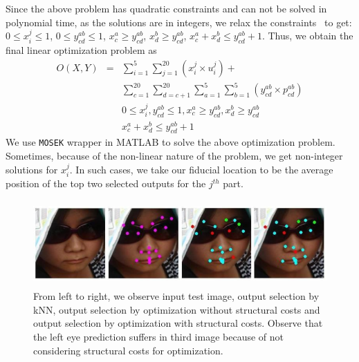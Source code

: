 
Since the above problem has quadratic constraints and can not be solved in polynomial time, as the solutions are in integers, we
relax the constraints~\cite{DBLP:journals/corr/ChariLLS14} to get:
$0 \leq x_i^j \leq 1$, $0 \leq y_{cd}^{ab} \leq 1$, $x_c^a \geq y_{cd}^{ab}$, $x_d^b \geq
y_{cd}^{ab}$, $x_c^a + x_d^b \le y_{cd}^{ab} + 1$. Thus, we obtain the final linear
optimization problem as 
\begin{eqnarray}
O(X,Y) & = & \sum_{i=1}^{5} \sum_{j=1}^{20} (x_i^j \times u_i^j) + \nonumber \\
        & & \sum_{c=1}^{20} \sum_{d=c+1}^{20} \sum_{a=1}^{5} \sum_{b=1}^{5} (y_{cd}^{ab} \times p_{cd}^{ab}) \nonumber \\
        & & 0 \leq x_i^j, y^{ab}_{cd} \leq 1, x_c^a \geq y_{cd}^{ab}, x_d^b \geq y_{cd}^{ab} \nonumber \\
        & & x_c^a + x_d^b \le y_{cd}^{ab} + 1 
\end{eqnarray}
We use {\tt MOSEK} wrapper in MATLAB to solve the above optimization problem. Sometimes, because of
the non-linear nature of the problem, we get non-integer solutions for $x^j_i$. In such cases, we
take our fiducial location to be the average position of the top two selected outputs for the
$j^{th}$ part.

\begin{figure}
\centering
\includegraphics[width=4.5in,height=1.3in]{fid/figures/with_without_pairwise.png}
\caption{From left to right, we observe input test image, output selection by kNN, output selection by optimization without structural costs and output selection by optimization with structural costs. Observe that the left eye prediction suffers in third image because of not considering structural costs for optimization.}
\label{fig:with_without_structural_costs}
\end{figure}

